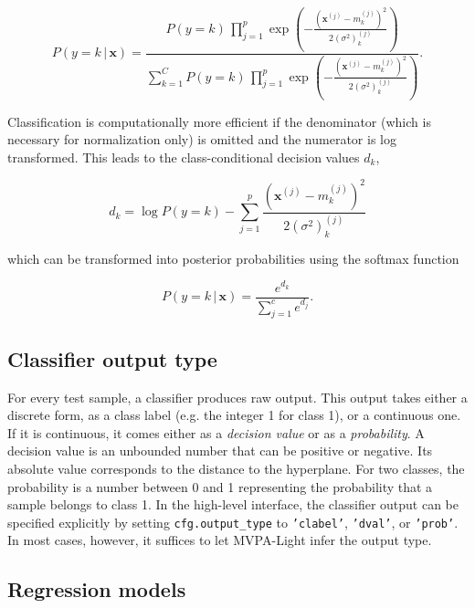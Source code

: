 \documentclass[utf8]{frontiersSCNS} %
\newcommand{\mf}[2]{m_#1^{(#2)}}
\newcommand{\sig}[2]{(\sigma^2)_#1^{(#2)}}
\newcommand{\x}{\mathbf{x}}
\newcommand{\xf}[1]{\mathbf{x}^{(#1)}} %
\newcommand{\ttt}[1]{\texttt{#1}}
\begin{document}
\begin{equation}
\label{eq:naive_bayes_gaussian}
P(y = k\,|\,\x) = \frac{P(y = k)\,\prod_{j=1}^p \exp(-\frac{(\xf{j} - \mf{k}{j})^2}{2\sig{k}{j}})}%
{\sum_{k=1}^C P(y = k)\,\prod_{j=1}^p \exp(-\frac{(\xf{j} - \mf{k}{j})^2}{2\sig{k}{j}})}.
\end{equation}

Classification is computationally more efficient if the denominator (which is necessary for normalization only) is omitted and the numerator is log transformed. This leads to the class-conditional decision values $d_k$,

\begin{equation}
\label{eq:naive_bayes_dval}
d_k = \log P(y = k) - \sum_{j=1}^p \frac{(\xf{j} - \mf{k}{j})^2}{2\sig{k}{j}}
\end{equation}

which can be transformed into posterior probabilities using the softmax function 

\begin{equation}
\label{eq:naive_bayes_softmax}
P(y = k\,|\,\x) = \frac{e^{d_k}}{\sum_{j=1}^c e^{d_j}}.
\end{equation}

\subsection{Classifier output type}\label{sec:output}

For every test sample, a classifier produces raw output. This output takes either a discrete form, as a class label (e.g. the integer 1 for class 1), or a continuous one. If it is continuous, it comes either as a \textit{decision value} or as a \textit{probability}. A decision value is an unbounded number that can be positive or negative. Its absolute value corresponds to the distance to the hyperplane. For two classes, the probability is a number between 0 and 1 representing the probability that a sample belongs to class 1. 
In the high-level interface, the classifier output can be specified explicitly by setting \ttt{cfg.output\_type} to \ttt{'clabel'}, \ttt{'dval'}, or \ttt{'prob'}. In most cases, however, it suffices to let MVPA-Light infer the output type.

\subsection{Regression models}\label{sec:regression}
\end{document}
